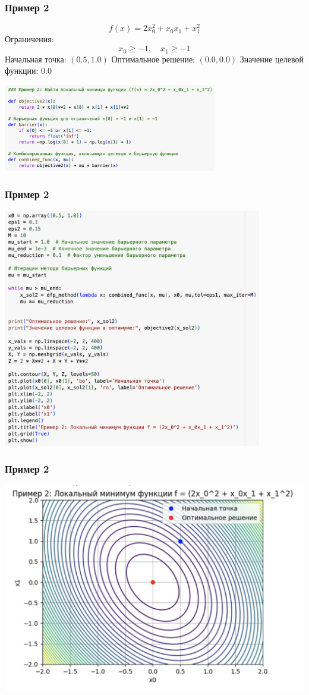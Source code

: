 \documentclass[12pt,pdf,hyperref={unicode}]{beamer}
\begin{document}
\begin{frame}
\frametitle{Пример 2}
\[
f(x) = 2x_0^2 + x_0x_1 + x_1^2
\]
Ограничения: \\
\[
x_0 \geq -1, \quad x_1 \geq -1
\]
Начальная точка: $(0.5, 1.0)$
Оптимальное решение: $(0.0, 0.0)$
Значение целевой функции: $0.0$
\begin{center}
    \includegraphics[width=0.7\textwidth]{image7.png}
\end{center}
\end{frame}

\begin{frame}
\frametitle{Пример 2}
\begin{center}
    \includegraphics[width=0.85\textwidth]{image8.png}
\end{center}
\end{frame}

\begin{frame}
\frametitle{Пример 2}
\begin{center}
    \includegraphics[width=1\textwidth]{image9.png}
\end{center}
\end{frame}
\end{document}
